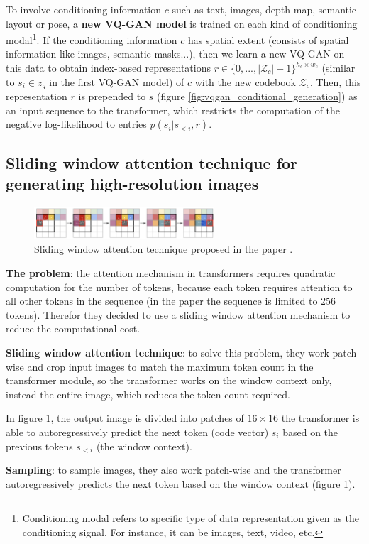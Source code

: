 To involve conditioning information $c$ such as text, images, depth map, semantic layout or pose, a \textbf{new VQ-GAN model} is trained on each kind of conditioning modal\footnote{Conditioning modal refers to specific type of data representation given as the conditioning signal. For instance, it can be images, text, video, etc.}. If the conditioning information $c$ has spatial extent (consists of spatial information like images, semantic masks...), then we learn a new VQ-GAN on this data to obtain index-based representations $r \in \{0,...,|\mathcal{Z}_c| - 1\}^{h_c \times w_c}$ (similar to $s_i \in z_q$ in the first VQ-GAN model) of $c$ with the new codebook $\mathcal{Z}_c$. Then, this representation $r$ is prepended to $s$ (figure \ref{fig:vqgan_conditional_generation}) as an input sequence to the transformer, which restricts the computation of the negative log-likelihood to entries $p(s_i | s_{<i}, r)$.








\subsection{Sliding window attention technique for generating high-resolution images}

\begin{figure}[h]
    \centering
    \includegraphics[width=0.6\textwidth]{images/vqgan_sliding_attention.png}
    \caption{Sliding window attention technique proposed in the paper \cite{vqgan}.}
    \label{fig:vqgan_sliding_window}
\end{figure}

\textbf{The problem}: the attention mechanism in transformers requires quadratic computation for the number of tokens, because each token requires attention to all other tokens in the sequence (in the paper the sequence is limited to 256 tokens). Therefor they decided to use a sliding window attention mechanism to reduce the computational cost.

\textbf{Sliding window attention technique}: to solve this problem, they work patch-wise and crop input images to match the maximum token count in the transformer module, so the transformer works on the window context only, instead the entire image, which reduces the token count required.

In figure \ref{fig:vqgan_sliding_window}, the output image is divided into patches of $16\times 16$  the transformer is able to autoregressively predict the next token (code vector) $s_i$ based on the previous tokens $s_{<i}$ (the window context).


\textbf{Sampling}: to sample images, they also work patch-wise and the transformer autoregressively predicts the next token based on the window context (figure \ref{fig:vqgan_sliding_window}).

